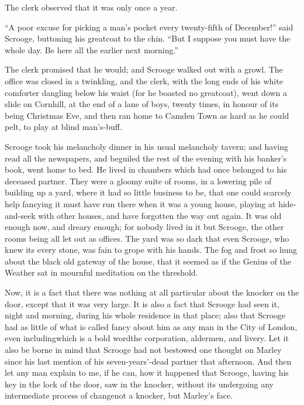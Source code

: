 \documentclass[paper=5.5in:8.5in,BCOR=7mm,twoside,DIV=calc,12pt,usegeometry]{scrbook} %
\begin{document}
The clerk observed that it was only once a year.

\enquote{A poor excuse for picking a man's pocket every twenty-fifth of December!} said Scrooge, buttoning his greatcoat to the chin. \enquote{But I suppose you must have the whole day. Be here all the earlier next morning.}

The clerk promised that he would; and Scrooge walked out with a growl. The office was closed in a twinkling, and the clerk, with the long ends of his white comforter dangling below his waist (for he boasted no greatcoat), went down a slide on Cornhill, at the end of a lane of boys, twenty times, in honour of its being Christmas Eve, and then ran home to Camden Town as hard as he could pelt, to play at blind man's-buff.

Scrooge took his melancholy dinner in his usual melancholy tavern; and having read all the newspapers, and beguiled the rest of the evening with his banker's book, went home to bed. He lived in chambers which had once belonged to his deceased partner. They were a gloomy suite of rooms, in a lowering pile of building up a yard, where it had so little business to be, that one could scarcely help fancying it must have run there when it was a young house, playing at hide-and-seek with other houses, and have forgotten the way out again. It was old enough now, and dreary enough; for nobody lived in it but Scrooge, the other rooms being all let out as offices. The yard was so dark that even Scrooge, who knew its every stone, was fain to grope with his hands. The fog and frost so hung about the black old gateway of the house, that it seemed as if the Genius of the Weather sat in mournful meditation on the threshold.

Now, it is a fact that there was nothing at all particular about the knocker on the door, except that it was very large. It is also a fact that Scrooge had seen it, night and morning, during his whole residence in that place; also that Scrooge had as little of what is called fancy about him as any man in the City of London, even including\textemdash which is a bold word\textemdash the corporation, aldermen, and livery. Let it also be borne in mind that Scrooge had not bestowed one thought on Marley since his last mention of his seven-years'-dead partner that afternoon. And then let any man explain to me, if he can, how it happened that Scrooge, having his key in the lock of the door, saw in the knocker, without its undergoing any intermediate process of change\textemdash not a knocker, but Marley's face.
\end{document}
